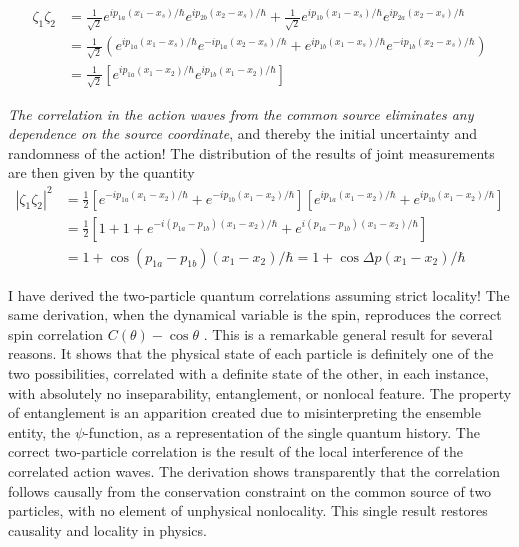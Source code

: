 \begin{align*}
\zeta_1 \zeta_2 & = \frac{1}{\sqrt{2}} e^{ip_{1a} (x_1- x_s) /\hbar} e^{ip_{2b} (x_2 -x_s) /\hbar} + \frac{1}{\sqrt{2}} e^{ip_{1b} (x_1 - x_s) /\hbar} e^{ip_{2a} (x_2 - x_s) /\hbar}  \tag{39}\label{c14-eq39} \\
& = \frac{1}{\sqrt{2}}  \left(e^{ip_{1a} (x_1- x_s) /\hbar} e^{-ip_{1a} (x_2 -x_s) /\hbar} + e^{ip_{1b} (x_1 - x_s) /\hbar} e^{-ip_{1b} (x_2 - x_s) /\hbar} \right) \tag{40}\label{c14-eq40}\\
& = \frac{1}{\sqrt{2}} \left[ e^{ip_{1a} (x_1- x_2) / \hbar} e^{ip_{1b} (x_1 -x_2) /\hbar}  \right]\tag{41}\label{c14-eq41}
\end{align*}

\textit{The correlation in the action waves from the common source eliminates any dependence on
the source coordinate}, and thereby the initial uncertainty and randomness of the action! The
distribution of the results of joint measurements are then given by the quantity
\begin{align*}
|\zeta_1 \zeta_2|^2 & = \frac{1}{2} \left[e^{-ip_{1a} (x_1 -x_2)/\hbar} + e^{-ip_{1b} (x_1-x_2)/\hbar} \right] \left[e^{ip_{1a} (x_1 -x_2) /\hbar} + e^{ip_{1b} (x_1 - x_2)/\hbar} \right] \\
& = \frac{1}{2} \left[1+1+e^{-i(p_{1a} - p_{1b}) (x_1-x_2)/\hbar } + e^{i(p_{1a} -p_{1b}) (x_1-x_2)/\hbar} \right]\\
& = 1 + \cos (p_{1a} - p_{1b}) (x_1 -x_2) / \hbar = 1 + \cos \Delta p (x_1-x_2) / \hbar
\end{align*}


I have derived the two-particle quantum correlations assuming strict locality! The same
derivation, when the dynamical variable is the spin, reproduces the correct spin correlation
$C(\theta) - \cos \theta$ \cite{chap14-key2}. This is a remarkable general result for several reasons. It shows that
the physical state of each particle is definitely one of the two possibilities, correlated with
a definite state of the other, in each instance, with absolutely no inseparability, entanglement, or nonlocal feature. The property of entanglement is an apparition created due to misinterpreting the ensemble entity, the $\psi$-function, as a representation of the single quantum history. The correct two-particle correlation is the result of the local interference of the correlated action waves. The derivation shows transparently that the correlation follows causally from the conservation constraint on the common source of two particles, with no element of unphysical nonlocality. This single result restores causality and locality in
physics.

